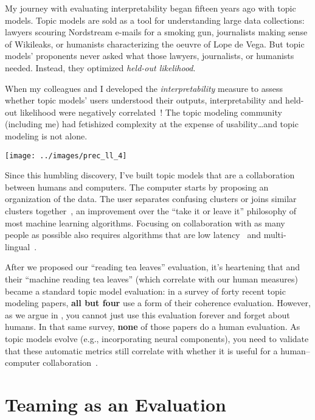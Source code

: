 My journey with evaluating interpretability began fifteen years ago
with topic models.
%
Topic models are sold as a tool for understanding large data
collections: lawyers scouring Nordstream e-mails for a smoking gun,
journalists making sense of Wikileaks, or humanists characterizing the
oeuvre of Lope de Vega.
%
But topic models' proponents never asked what those lawyers,
journalists, or humanists needed.
%
Instead, they optimized \emph{held-out likelihood}.

When my colleagues
and I developed the \emph{interpretability} measure to assess whether topic
models' users understood their outputs, interpretability and
held-out likelihood were negatively correlated~\cite{chang-09b}!
%
The topic modeling community (including me) had fetishized complexity
at the expense of usability\dots and topic modeling is not alone.

\begin{center}
\texttt{[image: ../images/prec\_ll\_4]}
\end{center}

Since this humbling discovery, I've built topic models that are a
collaboration between humans and computers.  The computer starts by
proposing an organization of the data.  The user separates confusing
clusters or joins similar clusters together~\cite{hu-14:itm}, an
improvement over the ``take it or leave it'' philosophy of most
machine learning algorithms.
%
Focusing on collaboration with as many people as possible also requires algorithms that are low
latency~\cite{lund-17} and
multi-lingual~\cite{Yuan-18}.

After we proposed our ``reading tea leaves'' evaluation, it's
heartening that  and their ``machine reading tea
leaves'' (which correlate with our human measures) became a standard
topic model evaluation: in a survey of forty recent topic modeling
papers, {\bf all but four} use a form of their coherence evaluation.
%
However, as we argue in , you cannot just use this
evaluation forever and forget about humans.
%
In that same survey, {\bf none} of those papers do a human evaluation.
%
As topic models evolve (e.g., incorporating
neural components), you need to validate that these automatic metrics
still correlate with whether it is useful for a human--computer
collaboration~\cite{Li:Mao:Stephens:Goel:Walpole:Fung:Dima:Boyd-Graber-2024}.

\section{Teaming as an Evaluation}

